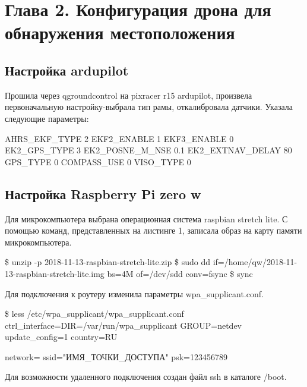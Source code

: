 \section{Глава 2. Конфигурация дрона для обнаружения местоположения}


\subsection{Настройка ardupilot}
Прошила через qgroundcontrol на pixracer r15 ardupilot, произвела первоначальную настройку-выбрала тип рамы, откалибровала датчики.
Указала следующие параметры:
\begin{MyCode}
AHRS\_EKF\_TYPE 2
EKF2\_ENABLE 1
EKF3\_ENABLE 0
EK2\_GPS\_TYPE 3
EK2\_POSNE\_M\_NSE 0.1
EK2\_EXTNAV\_DELAY 80
GPS\_TYPE 0
COMPASS\_USE 0
VISO\_TYPE 0
\end{MyCode}

\subsection{Настройка Raspberry Pi zero w}

Для микрокомпьютера выбрана операционная система raspbian stretch lite.
С помощью команд, представленных на листинге 1, записала образ на карту памяти микрокомпьютера.
\begin{MyCode}
\$ unzip -p 2018-11-13-raspbian-stretch-lite.zip
\$ sudo dd if=/home/qw/2018-11-13-raspbian-stretch-lite.img bs=4M of=/dev/sdd conv=fsync
\$ sync
\end{MyCode}
Для подключения к роутеру изменила параметры wpa\_supplicant.conf.
\begin{MyCode}
\$ less /etc/wpa_supplicant/wpa_supplicant.conf
ctrl_interface=DIR=/var/run/wpa_supplicant GROUP=netdev
update_config=1
country=RU

network={
	ssid="ИМЯ_ТОЧКИ_ДОСТУПА"
	psk=123456789
}
\end{MyCode}
Для возможности удаленного подключения создан файл ssh в каталоге /boot.

